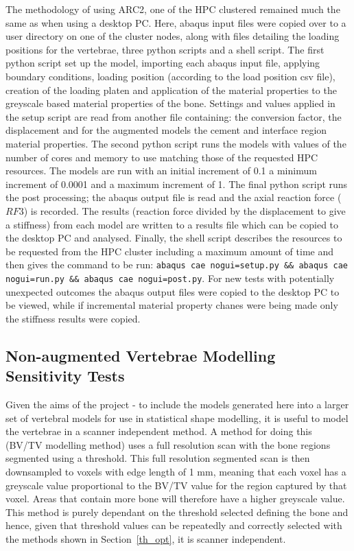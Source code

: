 The methodology of using ARC2, one of the HPC clustered remained much the same
as when using a desktop PC. Here, abaqus input files were copied over to a user
directory on one of the cluster nodes, along with files detailing the loading
positions for the vertebrae, three python scripts and a shell script. The first
python script set up the model, importing each abaqus input file, applying
boundary conditions, loading position (according to the load position csv
file), creation of the  loading platen and application of the material
properties to the greyscale based material properties of the bone. Settings and
values applied in the setup script are read from another file containing: the
conversion factor, the displacement and for the augmented models the cement and
interface region material properties. The second python script runs the models
with values of the number of cores and memory to use matching those of the
requested HPC resources. The models are run with an initial increment of 0.1 a
minimum increment of 0.0001 and a maximum increment of 1. The final python
script runs the post processing; the abaqus output file is read and the axial
reaction force ($RF3$) is recorded. The results (reaction force divided by the
displacement to give a stiffness) from each model are written to a results file
which can be copied to the desktop PC and analysed. Finally, the shell script
describes the resources to be requested from the HPC cluster including a
maximum amount of time and then gives the command to be run: \texttt{abaqus cae
nogui=setup.py \&\& abaqus cae nogui=run.py \&\& abaqus cae nogui=post.py}. For
new
tests with potentially unexpected outcomes the abaqus output files were copied
to the desktop PC to be viewed, while if incremental material property chanes
were being made only the stiffness results were copied.


\subsection{Non-augmented Vertebrae Modelling Sensitivity
Tests}\label{sec:non_aug_sens}

Given the aims of the project - to include the models generated here into a
larger set of vertebral models for use in statistical shape modelling, it is
useful to model the vertebrae in a scanner independent method. A method for
doing this (BV/TV modelling method) uses a full resolution scan with the bone
regions segmented using a threshold. This full resolution segmented scan is
then
downsampled to voxels with edge length of 1 mm, meaning that each voxel has a
greyscale value proportional to the BV/TV value for the region captured by that
voxel. Areas that contain more bone will therefore have a higher greyscale
value. This method is purely dependant on the threshold selected defining the
bone and hence, given that threshold values can be repeatedly and correctly
selected with the methods shown in Section~\ref{th_opt}, it is scanner
independent.

